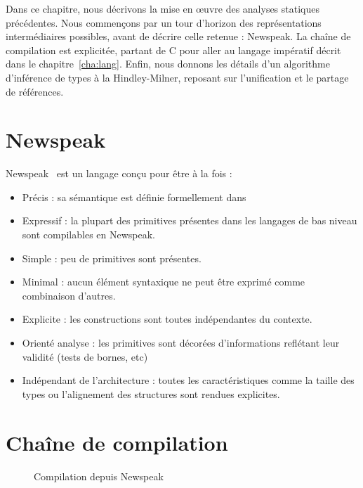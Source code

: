 Dans ce chapitre, nous décrivons la mise en œuvre des analyses statiques
précédentes. Nous commençons par un tour d'horizon des représentations
intermédiaires possibles, avant de décrire celle retenue : Newspeak. La chaîne
de compilation est explicitée, partant de C pour aller au langage impératif
décrit dans le chapitre~\ref{cha:lang}. Enfin, nous donnons les détails d'un
algorithme d'inférence de types à la Hindley-Milner, reposant sur l'unification
et le partage de références.


\section{Newspeak}
\label{sec:npk}

Newspeak~\cite{newspeak} est un langage conçu pour être à la fois :

\begin{itemize}
  \item Précis : sa sémantique est définie formellement dans~\cite{newspeak}
  \item Expressif : la plupart des primitives présentes dans les
    langages de bas niveau sont compilables en Newspeak.
  \item Simple : peu de primitives sont présentes.
  \item Minimal : aucun élément syntaxique ne peut être exprimé
    comme combinaison d'autres.
  \item Explicite : les constructions sont toutes indépendantes du
    contexte.
  \item Orienté analyse : les primitives sont décorées d'informations
    reflétant leur validité (tests de bornes, etc)
  \item Indépendant de l'architecture : toutes les caractéristiques comme
    la taille des types ou l'alignement des structures sont rendues explicites.
\end{itemize}


\wip{}

\section{Chaîne de compilation}

\begin{figure}
  \centering
  
  \caption{Compilation depuis Newspeak}
  \label{fig:compil-npk}
\end{figure}

